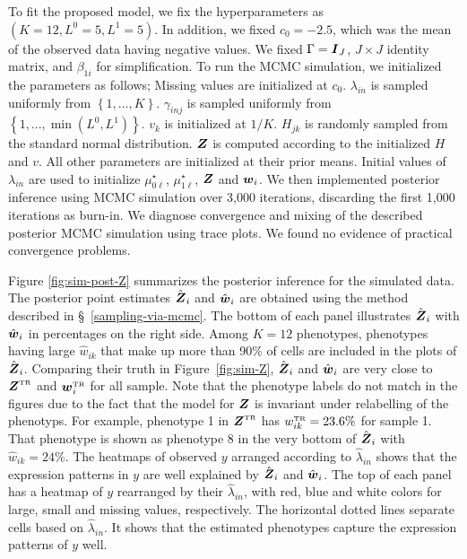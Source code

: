 \documentclass[12pt,]{article}
\newcommand{\bc}[1]{ \left\{#1\right\} }
\def\Z{\bm{Z}}
\newcommand{\true}{{\mbox{\tiny TR}}}
\newcommand{\bZ}{\mbox{\boldmath $Z$}}
\newcommand{\bw}{\mbox{\boldmath $w$}}
\newcommand{\bI}{\mbox{\boldmath $I$}}
\begin{document}
To fit the proposed model, we fix the hyperparameters as
$(K=12, L^0=5, L^1=5)$. In addition, we fixed $c_0=-2.5$, which was
the mean of the observed data having negative values.
We fixed $\Gamma=\bI_J$, $J\times J$ identity matrix, and $\beta_{1i}$ for
simplification. To run the MCMC simulation, we initialized the parameters
as follows;
Missing values are initialized at $c_0$. $\lambda_{in}$ is sampled uniformly
from $\bc{1,...,K}$. $\gamma_{inj}$ is sampled uniformly from
$\bc{1,...,\min(L^0,L^1)}$. $v_k$ is initialized at $1/K$. $H_{jk}$ is randomly
sampled from the standard normal distribution. $\bZ$ is computed according
to the initialized $H$ and $v$. All other parameters are initialized at
their prior means.
Initial values of $\lambda_{in}$ are used to initialize $\mu^{\star}_{0\ell}$, $\mu^{\star}_{1\ell}$, $\bZ$ and $\bw_i$.
We then implemented posterior inference using MCMC simulation
over 3,000 iterations, discarding the first 1,000 iterations as burn-in.
We diagnose convergence and mixing of the described posterior MCMC simulation using trace plots. We found no evidence of practical convergence problems. 


Figure \ref{fig:sim-post-Z} summarizes the posterior inference for the
simulated data.  The posterior point estimates $\hat{\bZ}_i$ and $\hat{\bw}_i$
are obtained using the method described in \S~\ref{sampling-via-mcmc}.  
%
The bottom of each panel illustrates $\hat{\bZ}_i$ with $\hat{\bw}_i$ in
percentages on the right side. Among $K=12$ phenotypes, phenotypes having large
$\hat{w}_{ik}$ that make up more than 90\% of cells are included in the plots
of $\hat{\bZ}_i$. Comparing their truth in Figure~\ref{fig:sim-Z},
$\hat{\bZ}_i$ and $\hat{\bw}_i$ are very close to $\bZ^\true$ and $\bw_i^\true$
for all sample. Note that the phenotype labels do not match in the figures due
to the fact that the model for $\bZ$ is invariant under relabelling of the
phenotyps. For example, phenotype 1 in $\bZ^\true$ has $w^\true_{ik}=23.6\%$
for sample 1.  That phenotype is shown as phenotype 8 in the very bottom of
$\hat{\bZ}_i$ with $\hat{w}_{ik}=24\%$.
The heatmaps of observed $y$ arranged according to $\hat{\lambda}_{in}$ shows
that the expression patterns in $y$ are well explained by $\hat{\bZ}_i$ and
$\hat{\bw}_i$.  The top of each panel has a heatmap of $y$ rearranged by their
$\hat{\lambda}_{in}$, with red, blue and white colors for large, small and
missing values, respectively.  The horizontal dotted lines separate cells based
on $\hat{\lambda}_{in}$.  It shows that the estimated phenotypes capture the
expression patterns of $y$ well.    
\end{document}
